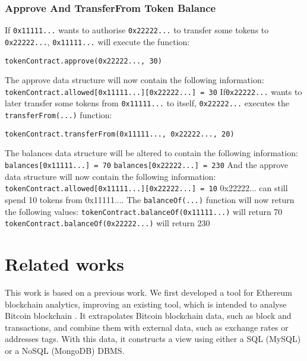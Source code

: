 \subsubsection{Approve And TransferFrom Token Balance}
If \texttt{0x11111...} wants to authorise \texttt{0x22222...} to transfer some tokens to \texttt{0x22222...}, \texttt{0x11111...} will execute the function:
\begin{lstlisting}[language=Solidity]
    tokenContract.approve(0x22222..., 30)
\end{lstlisting}
The approve data structure will now contain the following information:
\newline
\hspace*{4ex} \texttt{tokenContract.allowed[0x11111...][0x22222...] = 30}
\newline
If\texttt{0x22222...} wants to later transfer some tokens from \texttt{0x11111...} to itself, \texttt{0x22222...} executes the \texttt{transferFrom(...)} function:
\begin{lstlisting}[language=Solidity]
    tokenContract.transferFrom(0x11111..., 0x22222..., 20)
\end{lstlisting}
The balances data structure will be altered to contain the following information:
\newline
\hspace*{4ex} \texttt{balances[0x11111...] = 70}
\newline
\hspace*{4ex} \texttt{balances[0x22222...] = 230}
\newline
And the approve data structure will now contain the following information:
\newline
\hspace*{4ex} \texttt{tokenContract.allowed[0x11111...][0x22222...] = 10}
\newline
0x22222... can still spend 10 tokens from 0x11111....
The \texttt{balanceOf(...)} function will now return the following values:
\newline
\hspace*{4ex} \texttt{tokenContract.balanceOf(0x11111...)} will return 70
\newline
\hspace*{4ex} \texttt{tokenContract.balanceOf(0x22222...)} will return 230

\section{Related works}
This work is based on a previous work. We first developed a tool for Ethereum blockchain analytics, improving an existing tool, which is intended to analyse Bitcoin blockchain  \cite{bartoletti2017generalbit}. It extrapolates Bitcoin blockchain data, such as block and transactions, and combine them with external data, such as exchange rates or addresses tags. With this data, it constructs a view using either a SQL (MySQL) or a NoSQL (MongoDB) DBMS.

